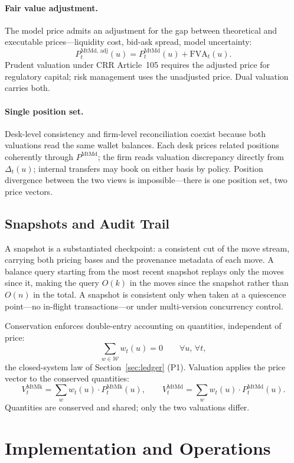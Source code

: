 \documentclass[11pt,a4paper]{article}
\begin{document}
\paragraph{Fair value adjustment.} The model price admits an adjustment for the gap between theoretical and executable prices---liquidity cost, bid-ask spread, model uncertainty:
\[
P_t^{\text{MtMd, adj}}(u) = P_t^{\text{MtMd}}(u) + \text{FVA}_t(u).
\]
Prudent valuation under CRR Article~105 requires the adjusted price for regulatory capital; risk management uses the unadjusted price. Dual valuation carries both.

\paragraph{Single position set.} Desk-level consistency and firm-level reconciliation coexist because both valuations read the same wallet balances. Each desk prices related positions coherently through $P^{\text{MtMd}}$; the firm reads valuation discrepancy directly from $\Delta_t(u)$; internal transfers may book on either basis by policy. Position divergence between the two views is impossible---there is one position set, two price vectors.

\subsection{Snapshots and Audit Trail}
\label{subsec:snapshots}

A snapshot is a substantiated checkpoint: a consistent cut of the move stream, carrying both pricing bases and the provenance metadata of each move. A balance query starting from the most recent snapshot replays only the moves since it, making the query $O(k)$ in the moves since the snapshot rather than $O(n)$ in the total. A snapshot is consistent only when taken at a quiescence point---no in-flight transactions---or under multi-version concurrency control.

Conservation enforces double-entry accounting on quantities, independent of price:
\[
\sum_{w\in\mathcal{W}} w_t(u) = 0 \qquad \forall u,\,\forall t,
\]
the closed-system law of Section~\ref{sec:ledger} (P1). Valuation applies the price vector to the conserved quantities:
\[
V_t^{\text{MtMk}} = \sum_{w} w_t(u)\cdot P_t^{\text{MtMk}}(u), \qquad
V_t^{\text{MtMd}} = \sum_{w} w_t(u)\cdot P_t^{\text{MtMd}}(u).
\]
Quantities are conserved and shared; only the two valuations differ.

\section{Implementation and Operations}
\label{sec:implementation}
\end{document}

